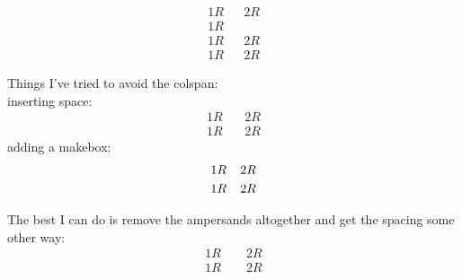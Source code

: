 \documentclass[oneside]{book}
\begin{document}
\begin{align*}1R&&2R\\1R&&\end{align*}
\begin{align*}1R&&2R\\1R&&2R\end{align*}

Things I've tried to avoid the colspan:\\
inserting space:
\begin{align*}1R&\,&2R\\1R&\,&2R\end{align*}
adding a makebox:
\begin{align*}1R&\makebox[1pt]{}&2R\\1R&\makebox[1pt]{}&2R\end{align*}

The best I can do is remove the ampersands altogether and get the spacing some other way:
\begin{align*}1R\qquad2R\\1R\qquad2R\end{align*}
\end{document}
